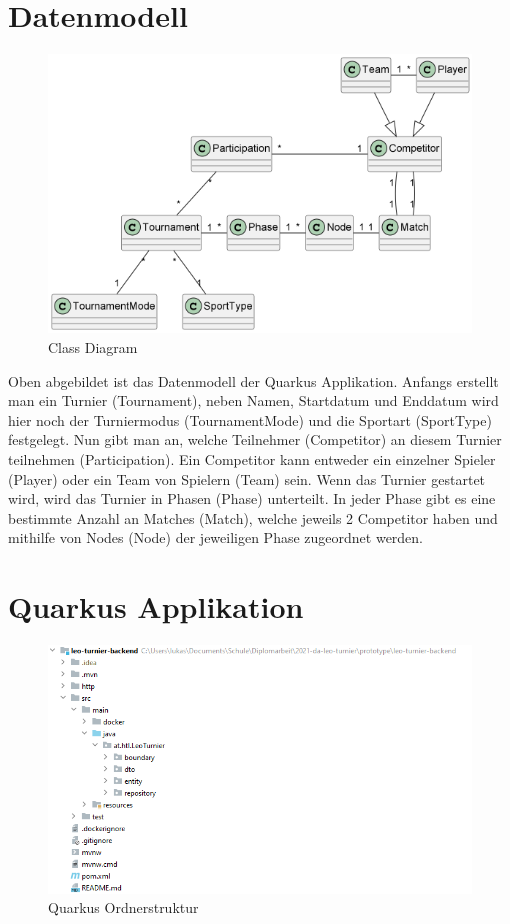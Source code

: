 \section{Datenmodell}

\begin{figure}[H]
    \includegraphics[scale=1]{pics/class_diagram.png}
    \caption{Class Diagram}
\end{figure}

Oben abgebildet ist das Datenmodell der Quarkus Applikation. Anfangs erstellt man ein Turnier (Tournament), neben Namen, Startdatum und Enddatum 
wird hier noch der Turniermodus (TournamentMode) und die Sportart (SportType) festgelegt. Nun gibt man an, welche Teilnehmer (Competitor) an diesem Turnier teilnehmen (Participation). 
Ein Competitor kann entweder ein einzelner Spieler (Player) oder ein Team von Spielern (Team) sein.
Wenn das Turnier gestartet wird, wird das Turnier in Phasen (Phase) unterteilt. In jeder Phase gibt es eine bestimmte Anzahl an Matches (Match), welche jeweils 2 Competitor haben und mithilfe von Nodes (Node) 
der jeweiligen Phase zugeordnet werden.

\section{Quarkus Applikation}

\begin{figure}[H]
    \includegraphics[scale=0.8]{pics/quarkus_file_structure.png}
    \caption{Quarkus Ordnerstruktur}
\end{figure}

